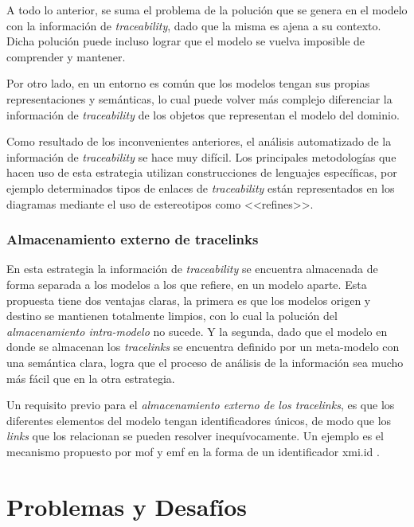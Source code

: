 \documentclass[a4paper,12pt,oneside,spanish]{book}
\begin{document}
A todo lo anterior, se suma el problema de la polución que se genera en el modelo con la información de \textit{traceability}, dado que la misma es ajena a su contexto. Dicha polución puede incluso lograr que el modelo se vuelva imposible de comprender y mantener.

Por otro lado, en un entorno  es común que los modelos tengan sus propias representaciones y semánticas, lo cual puede volver más complejo diferenciar la información de \textit{traceability} de los objetos que representan el modelo del dominio.

Como resultado de los inconvenientes anteriores, el análisis automatizado de la información de \textit{traceability} se hace muy difícil. Los principales metodologías que hacen uso de esta estrategia utilizan construcciones de lenguajes específicas, por ejemplo determinados tipos de enlaces de \textit{traceability} están representados en los diagramas  mediante el uso de estereotipos como \textsf{<<refines>>}.

\subsection{Almacenamiento externo de tracelinks}

En esta estrategia la información de \textit{traceability} se encuentra almacenada de forma separada a los modelos a los que refiere, en un modelo aparte. Esta propuesta tiene dos ventajas claras, la primera es que los modelos origen y destino se mantienen totalmente limpios, con lo cual la polución del \textit{almacenamiento intra-modelo} no sucede. Y la segunda, dado que el modelo en donde se almacenan los \textit{tracelinks} se encuentra definido por un meta-modelo con una semántica clara, logra que el proceso de análisis de la información sea mucho más fácil que en la otra estrategia.

Un requisito previo para el \textit{almacenamiento externo de los tracelinks}, es que los diferentes elementos del modelo tengan identificadores únicos, de modo que los \textit{links} que los relacionan se pueden resolver inequívocamente. Un ejemplo es el mecanismo propuesto por \gls{mof} y \gls{emf} en la forma de un identificador \textsf{xmi.id} .




\chapter{Problemas y Desafíos}
\label{cap:ProblemasDesafios}
\end{document}
